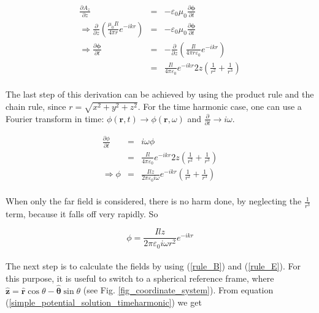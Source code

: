 \documentclass[a4paper,10pt]{thesis}
\begin{document}
\begin{eqnarray}
\frac{\partial A_z }{\partial z}&=&-\varepsilon_0 \mu_0\frac{\partial \mathbf{\phi}}{\partial t} \label{lorenz_simplified} \\
\Rightarrow \frac{\partial }{\partial z} \left(  \frac{ \mu_0 I l}{4 \pi r} e^{-ikr } \right) &=&-\varepsilon_0 \mu_0\frac{\partial \mathbf{\phi}}{\partial t} \nonumber \\
\Rightarrow \frac{\partial \mathbf{\phi}}{\partial t} &=&-  \frac{\partial }{\partial z} \left(  \frac{ I l}{4 \pi r \varepsilon_0} e^{-ikr } \right)  \nonumber\\
&=&  \frac{ I l}{4 \pi \varepsilon_0} e^{-ikr } 2z \left( \frac{1}{r^2} + \frac{1}{r^3} \right) \label{diff_eq_scalar_pot}
\end{eqnarray}

\paragraph*{}
The last step of this derivation can be achieved by using the product rule and the chain rule, since $r=\sqrt{x^2+y^2+z^2}$. For the time harmonic case, one can use a Fourier transform in time: $\phi (\mathbf{r},t) \rightarrow \phi (\mathbf{r},\omega)$ and $\frac{\partial }{\partial t} \rightarrow i \omega$.

\begin{eqnarray}
\frac{\partial \phi}{\partial t} &=& i \omega \phi\\
&=& \frac{ I l}{4 \pi \varepsilon_0} e^{-ikr } 2z \left( \frac{1}{r^2} + \frac{1}{r^3} \right)  \nonumber \\
\Rightarrow \phi &=& \frac{ I l z}{2 \pi \varepsilon_0 i \omega} e^{-ikr } \left( \frac{1}{r^2} + \frac{1}{r^3} \right) \label{solution_scalar_pot_hd}
\end{eqnarray}

\paragraph*{}
When only the far field is considered, there is no harm done, by neglecting the $\frac{1}{r^3}$ term, because it falls off very rapidly. So

\begin{equation}\label{solution_scalar_pot_hd_ff}
\phi = \frac{ I l z}{2 \pi \varepsilon_0 i \omega r^2} e^{-ikr }
\end{equation}

\paragraph*{}
The next step is to calculate the fields by using (\ref{rule_B}) and (\ref{rule_E}). For this purpose, it is useful to switch to a spherical reference frame, where $\mathbf{\hat{z}}=\mathbf{\hat{r}} \cos \theta - \mathbf{\hat{\theta}} \sin \theta$ (see Fig. \ref{fig_coordinate_system}). From equation (\ref{simple_potential_solution_timeharmonic}) we get
\end{document}
